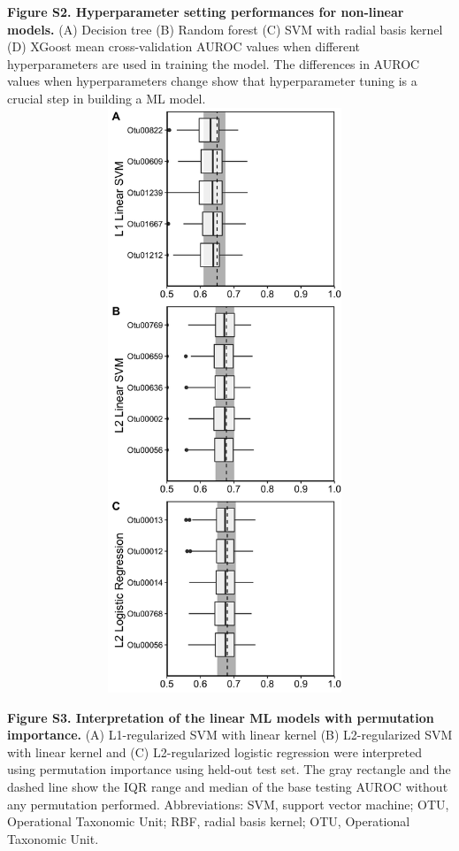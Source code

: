 \documentclass[11pt,]{article}
\begin{document}
\textbf{Figure S2. Hyperparameter setting performances for non-linear
models.} (A) Decision tree (B) Random forest (C) SVM with radial basis
kernel (D) XGoost mean cross-validation AUROC values when different
hyperparameters are used in training the model. The differences in AUROC
values when hyperparameters change show that hyperparameter tuning is a
crucial step in building a ML model. \newpage
\includegraphics[height=17.5cm, width=13cm]{Figure_S4.png}

\textbf{Figure S3. Interpretation of the linear ML models with
permutation importance.} (A) L1-regularized SVM with linear kernel (B)
L2-regularized SVM with linear kernel and (C) L2-regularized logistic
regression were interpreted using permutation importance using held-out
test set. The gray rectangle and the dashed line show the IQR range and
median of the base testing AUROC without any permutation performed.
Abbreviations: SVM, support vector machine; OTU, Operational Taxonomic
Unit; RBF, radial basis kernel; OTU, Operational Taxonomic Unit.
\end{document}
